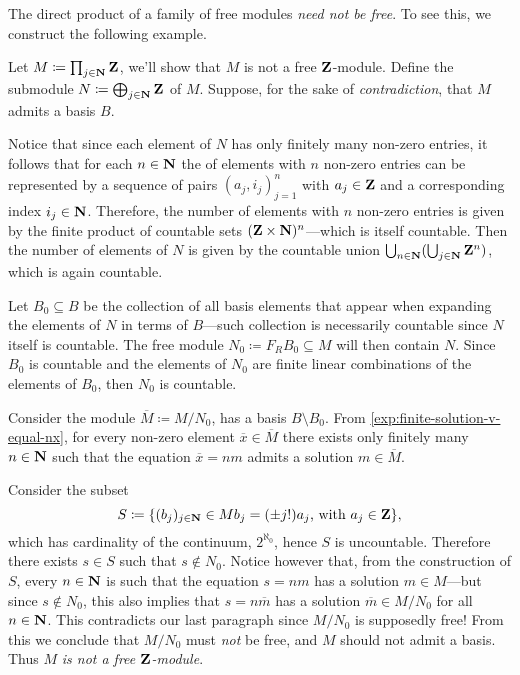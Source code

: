\begin{remark}
    \label{rem:direct-product-not-free}
    The direct product of a family of free modules \emph{need not be free}. To see
    this, we construct the following example.

    Let \(M \coloneq \prod_{j \in \mathbf{N}} \mathbf{Z}\), we'll show that \(M\) is not a free
    \(\mathbf{Z}\)-module. Define the submodule \(N \coloneq \bigoplus_{j \in \mathbf{N}} \mathbf{Z}\) of
    \(M\). Suppose, for the sake of \emph{contradiction}, that \(M\) admits a basis
    \(B\).

    Notice that since each element of \(N\) has only finitely many non-zero entries,
    it follows that for each \(n \in \mathbf{N}\) the of elements with \(n\) non-zero
    entries can be represented by a sequence of pairs \((a_j, i_j)_{j=1}^n\) with
    \(a_j \in \mathbf{Z}\) and a corresponding index \(i_j \in \mathbf{N}\). Therefore, the number
    of elements with \(n\) non-zero entries is given by the finite product of
    countable sets \((\mathbf{Z} \times \mathbf{N})^n\)---which is itself countable. Then the
    number of elements of \(N\) is given by the countable union
    \(\bigcup_{n \in \mathbf{N}} (\bigcup_{j \in \mathbf{N}} \mathbf{Z}^n)\), which is again countable.

    Let \(B_0 \subseteq B\) be the collection of all basis elements that appear when
    expanding the elements of \(N\) in terms of \(B\)---such collection is
    necessarily countable since \(N\) itself is countable. The free module
    \(N_0 \coloneq F_R B_0 \subseteq M\) will then contain \(N\). Since \(B_0\) is
    countable and the elements of \(N_0\) are finite linear combinations of the
    elements of \(B_0\), then \(N_0\) is countable.

    Consider the module \(\overline{M} \coloneq M/N_0\), has a basis
    \(B \setminus B_0\). From \cref{exp:finite-solution-v-equal-nx}, for every non-zero
    element \(\overline{x} \in \overline{M}\) there exists only finitely many
    \(n \in \mathbf{N}\) such that the equation \(\overline{x} = n m\) admits a solution
    \(m \in \overline{M}\).

    Consider the subset
    \[
        S \coloneq \{(b_{j})_{j \in \mathbf{N}} \in M \relax
        b_j = (\pm j!) a_j\text{, with } a_j \in \mathbf{Z}\},
    \]
    which has cardinality of the continuum, \(2^{\aleph_0}\), hence \(S\) is
    uncountable. Therefore there exists \(s \in S\) such that \(s \notin
    N_0\). Notice however that, from the construction of \(S\), every \(n \in \mathbf{N}\) is
    such that the equation \(s = n m\) has a solution \(m \in M\)---but since
    \(s \notin N_{0}\), this also implies that \(s = n \overline{m}\) has a solution
    \(\overline{m} \in M/N_0\) for all \(n \in \mathbf{N}\). This contradicts our last
    paragraph since \(M/N_0\) is supposedly free! From this we conclude that
    \(M/N_0\) must \emph{not} be free, and \(M\) should not admit a basis. Thus
    \(M\) \emph{is not a free \(\mathbf{Z}\)-module}.
\end{remark}

